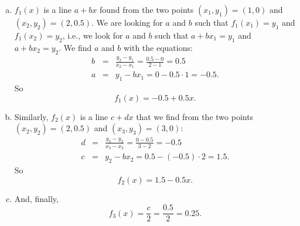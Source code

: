 \documentclass[12pt,thmsa]{article}\usepackage[]{graphicx}\usepackage[]{color}
\begin{document}
\begin{enumerate}
  \begin{enumerate}[(a)]
  \item $f_1(x)$ is a line $a + bx$ found from the two points $(x_1, y_1) = (1,0)$ and $(x_2, y_2) =
    (2,0.5)$. We are looking for $a$ and $b$ such that  $f_{1}(x_{1}) = y_{1}$ and $f_{1}(x_{2}) = y_{2}$, i.e., we look for $a$ and $b$ such that $a+bx_{1}=y_{1}$ and $a+bx_{2}=y_{2}$. We find $a$ and $b$ with the equations:
    \begin{eqnarray*}
      b &=& \frac{y_2 - y_1}{x_2 - x_1} = \frac{0.5-0}{2-1} = 0.5 \\
      a &=& y_1 - b x_1 = 0 - 0.5 \cdot 1 = -0.5.
    \end{eqnarray*}
    So
    \begin{equation*}
      f_1(x) = -0.5 + 0.5x.
    \end{equation*}
  \item Similarly, $f_2(x)$ is a line $c + dx$ that we find from the two points $(x_2, y_2) = (2,0.5)$ and $(x_3,y_3) = (3,0)$:
    \begin{eqnarray*}
      d &=& \frac{y_3 - y_2}{x_3 - x_2} = \frac{0-0.5}{3-2} = -0.5 \\
      c &=& y_2 - b x_2 = 0.5 - (-0.5) \cdot 2 = 1.5.
    \end{eqnarray*}
    So
    \begin{equation*}
      f_2(x) = 1.5-0.5x.
    \end{equation*}
  \item And, finally,
    \begin{equation*}
      f_3(x) = \frac{c}{2} = \frac{0.5}{2} = 0.25.
    \end{equation*}
  \end{enumerate}



\end{enumerate}
\end{document}
